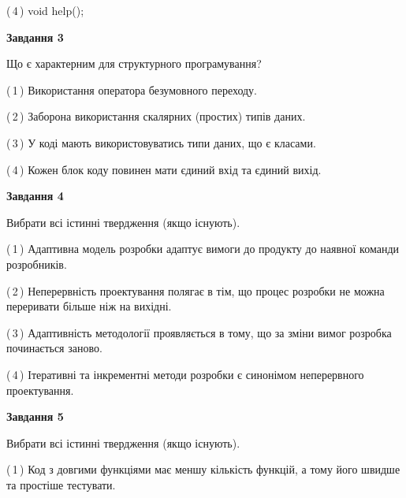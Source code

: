 \documentclass[10pt, ukrainian]{article}
\begin{document}
{\begin {large}
(\,4\,) void help();%


{\begin {center}\textbf{Завдання 3}\end {center}}\par
Що є характерним для структурного програмування?\par
\vspace{2mm}



(\,1\,) Використання оператора безумовного переходу. %



(\,2\,) Заборона використання скалярних (простих) типів даних. %



(\,3\,) У коді мають використовуватись типи даних, що є класами. %



(\,4\,) Кожен блок коду повинен мати єдиний вхід та єдиний вихід.%


{\begin {center}\textbf{Завдання 4}\end {center}}\par
Вибрати всі істинні твердження (якщо існують).\par
\vspace{2mm}



(\,1\,) Адаптивна модель розробки адаптує вимоги до продукту до наявної команди розробників. %



(\,2\,) Неперервність проектування полягає в тім, що процес розробки не можна переривати більше ніж на вихідні. %



(\,3\,) Адаптивність методології проявляється в тому, що за зміни вимог розробка починається заново. %



(\,4\,) Ітеративні та інкрементні методи розробки є синонімом неперервного проектування. %


{\begin {center}\textbf{Завдання 5}\end {center}}\par
Вибрати всі істинні твердження (якщо існують).\par
\vspace{2mm}



(\,1\,) Код з довгими функціями має меншу кількість функцій, а тому його швидше та простіше тестувати. %




\end{large}}
\end{document}

